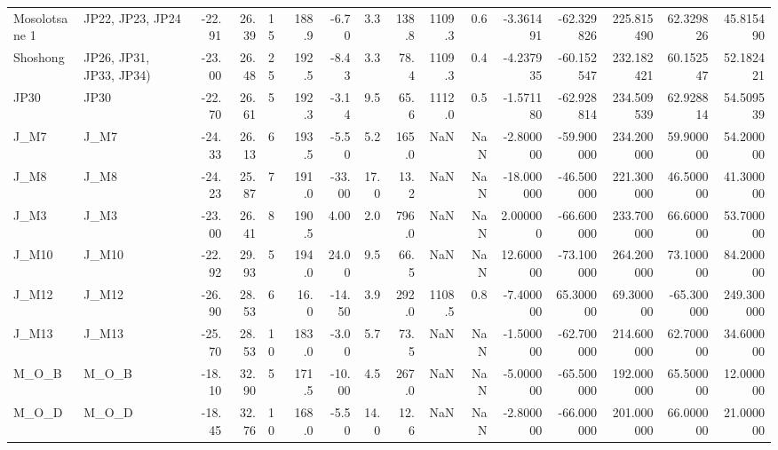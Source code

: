 \documentclass{article}
\begin{document}
{\begin{tabular}{llrrlrrrrrrrrrrr}
Mosolotsane 1 &         JP22, JP23, JP24 &    -22.91 &      26.39 &   15 &   188.9 &   -6.70 &   3.3 &  138.8 &  1109.3 &         0.6 &      -3.361491 & -62.329826 &  225.815490 &     62.329826 &      45.815490 \\
Shoshong      &  JP26, JP31, JP33, JP34) &    -23.00 &      26.48 &   25 &   192.5 &   -8.43 &   3.3 &   78.4 &  1109.3 &         0.4 &      -4.237935 & -60.152547 &  232.182421 &     60.152547 &      52.182421 \\
JP30          &                     JP30 &    -22.70 &      26.61 &    5 &   192.3 &   -3.14 &   9.5 &   65.6 &  1112.0 &         0.5 &      -1.571180 & -62.928814 &  234.509539 &     62.928814 &      54.509539 \\
J\_M7          &                     J\_M7 &    -24.33 &      26.13 &    6 &   193.5 &   -5.50 &   5.2 &  165.0 &     NaN &         NaN &      -2.800000 & -59.900000 &  234.200000 &     59.900000 &      54.200000 \\
J\_M8          &                     J\_M8 &    -24.23 &      25.87 &    7 &   191.0 &  -33.00 &  17.0 &   13.2 &     NaN &         NaN &     -18.000000 & -46.500000 &  221.300000 &     46.500000 &      41.300000 \\
J\_M3          &                     J\_M3 &    -23.00 &      26.41 &    8 &   190.5 &    4.00 &   2.0 &  796.0 &     NaN &         NaN &       2.000000 & -66.600000 &  233.700000 &     66.600000 &      53.700000 \\
J\_M10         &                    J\_M10 &    -22.92 &      29.93 &    5 &   194.0 &   24.00 &   9.5 &   66.5 &     NaN &         NaN &      12.600000 & -73.100000 &  264.200000 &     73.100000 &      84.200000 \\
J\_M12         &                    J\_M12 &    -26.90 &      28.53 &    6 &    16.0 &  -14.50 &   3.9 &  292.0 &  1108.5 &         0.8 &      -7.400000 &  65.300000 &   69.300000 &    -65.300000 &     249.300000 \\
J\_M13         &                    J\_M13 &    -25.70 &      28.53 &   10 &   183.0 &   -3.00 &   5.7 &   73.5 &     NaN &         NaN &      -1.500000 & -62.700000 &  214.600000 &     62.700000 &      34.600000 \\
M\_O\_B         &                    M\_O\_B &    -18.10 &      32.90 &    5 &   171.5 &  -10.00 &   4.5 &  267.0 &     NaN &         NaN &      -5.000000 & -65.500000 &  192.000000 &     65.500000 &      12.000000 \\
M\_O\_D         &                    M\_O\_D &    -18.45 &      32.76 &   10 &   168.0 &   -5.50 &  14.0 &   12.6 &     NaN &         NaN &      -2.800000 & -66.000000 &  201.000000 &     66.000000 &      21.000000 \\

\end{tabular}}
\end{document}
